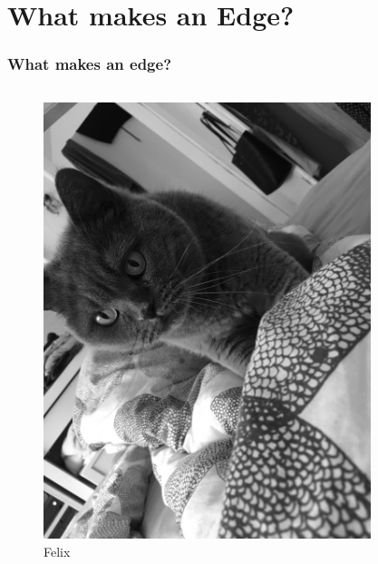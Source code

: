 \section{What makes an Edge?}
\begin{frame}
	\frametitle{What makes an edge?}
	\begin{columns}
		\begin{column}{0.5\textwidth}
			\begin{figure}
				\centering
				\includegraphics[width=0.8\linewidth]{images/Kadse}
				\caption[Felix]{Felix}
				\label{fig:kadse}
			\end{figure}
		\end{column}
		\begin{column}{0.5\textwidth} 
			\begin{center}
			\begin{figure}
				\centering

\end{figure}
\end{center}
\end{column}
\end{columns}
\end{frame}
